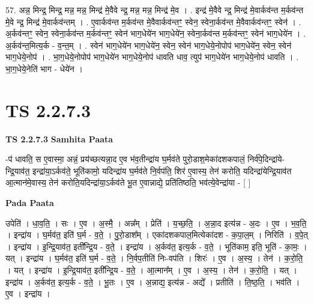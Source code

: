 \documentclass[17pt]{extarticle}
\begin{document}
57. अन्न॒ मिन्द्र॒ मिन्द्र॒ मन्न॒ मन्न॒ मिन्द्र॑ मे॒वैवे न्द्र॒ मन्न॒ मन्न॒ मिन्द्र॑ मे॒व । . इन्द्र॑ मे॒वैवे न्द्र॒ मिन्द्र॑ मे॒वार्कव॑न्त म॒र्कव॑न्त मे॒वे न्द्र॒ मिन्द्र॑ मे॒वार्कव॑न्तम् । . ए॒वार्कव॑न्त म॒र्कव॑न्त मे॒वैवार्कव॑न्तꣳ॒॒ स्वेन॒ स्वेना॒र्कव॑न्त मे॒वैवार्कव॑न्तꣳ॒॒ स्वेन॑ । . अ॒र्कव॑न्तꣳ॒॒ स्वेन॒ स्वेना॒र्कव॑न्त म॒र्कव॑न्तꣳ॒॒ स्वेन॑ भाग॒धेये॑न भाग॒धेये॑न॒ स्वेना॒र्कव॑न्त म॒र्कव॑न्तꣳ॒॒ स्वेन॑ भाग॒धेये॑न । . अ॒र्कव॑न्त॒मित्य॒र्क - व॒न्त॒म् । . स्वेन॑ भाग॒धेये॑न भाग॒धेये॑न॒ स्वेन॒ स्वेन॑ भाग॒धेये॒नोपोप॑ भाग॒धेये॑न॒ स्वेन॒ स्वेन॑ भाग॒धेये॒नोप॑ । . भा॒ग॒धेये॒नोपोप॑ भाग॒धेये॑न भाग॒धेये॒नोप॑ धावति धाव॒ त्युप॑ भाग॒धेये॑न भाग॒धेये॒नोप॑ धावति । . भा॒ग॒धेये॒नेति॑ भाग - धेये॑न । \newline
\pagebreak
{}

\section{ TS 2.2.7.3 }

\textbf{TS 2.2.7.3 } \newline
\textbf{Samhita Paata} \newline

-प॑ धावति॒ स ए॒वास्मा॒ अन्नं॒ प्रय॑च्छत्यन्ना॒द ए॒व भ॑व॒तीन्द्रा॑य घ॒र्मव॑ते पुरो॒डाश॒मेका॑दशकपालं॒ निर्व॑पे॒दिन्द्रा॑ये-न्द्रि॒याव॑त॒ इन्द्रा॑या॒ऽर्कव॑ते॒ भूति॑कामो॒ यदिन्द्रा॑य घ॒र्मव॑ते नि॒र्वप॑ति॒ शिर॑ ए॒वास्य॒ तेन॑ करोति॒ यदिन्द्रा॑येन्द्रि॒याव॑त आ॒त्मान॑मे॒वास्य॒ तेन॑ करोति॒यदिन्द्रा॑या॒ऽर्कव॑ते भू॒त ए॒वान्नाद्ये॒ प्रति॑तिष्ठति॒ भव॑त्ये॒वेन्द्रा॑या - [  ] \newline

\textbf{Pada Paata} \newline

उपेति॑ । धा॒व॒ति॒ । सः । ए॒व । अ॒स्मै॒ । अन्न᳚म् । प्रेति॑ । य॒च्छ॒ति॒ । अ॒न्ना॒द इत्य॑न्न - अ॒दः । ए॒व । भ॒व॒ति॒ । इन्द्रा॑य । घ॒र्मव॑त॒ इति॑ घ॒र्म - व॒ते॒ । पु॒रो॒डाश᳚म् । एका॑दशकपाल॒मित्येका॑दश - क॒पा॒ल॒म् । निरिति॑ । व॒पे॒त् । इन्द्रा॑य । इ॒न्द्रि॒याव॑त॒ इती᳚न्द्रि॒य - व॒ते॒ । इन्द्रा॑य । अ॒र्कव॑त॒ इत्य॒र्क - व॒ते॒ । भूति॑काम॒ इति॒ भूति॑ - का॒मः॒ । यत् । इन्द्रा॑य । घ॒र्मव॑त॒ इति॑ घ॒र्म - व॒ते॒ । नि॒र्वप॒तीति॑ निः-वप॑ति । शिरः॑ । ए॒व । अ॒स्य॒ । तेन॑ । क॒रो॒ति॒ । यत् । इन्द्रा॑य । इ॒न्द्रि॒याव॑त॒ इती᳚न्द्रि॒य - व॒ते॒ । आ॒त्मान᳚म् । ए॒व । अ॒स्य॒ । तेन॑ । क॒रो॒ति॒ । यत् । इन्द्रा॑य । अ॒र्कव॑त॒ इत्य॒र्क - व॒ते॒ । भू॒तः । ए॒व । अ॒न्नाद्य॒ इत्य॑न्न - अद्ये᳚ । प्रतीति॑ । ति॒ष्ठ॒ति॒ । भव॑ति । ए॒व । इन्द्रा॑य ।  \newline
\end{document}
